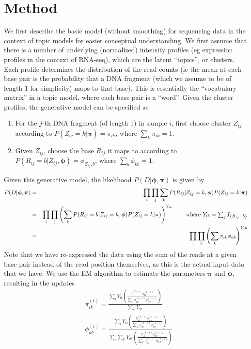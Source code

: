 \documentclass[11pt]{article}
\begin{document}
\section{Method}
We first describe the basic model (without smoothing) for sequencing data in the context of topic models for easier conceptual understanding. We first assume that there is a number of underlying (normalized) intensity profiles (eg expression profiles in the context of RNA-seq), which are the latent ``topics'', or clusters. Each profile determines the distribution of the read counts (ie the mean at each base pair is the probability that a DNA fragment (which we assume to be of length 1 for simplicity) maps to that base). This is essentially the ``vocabulary matrix'' in a topic model, where each base pair is a ``word''. Given the cluster profiles, the generative model can be specified as 
\begin{enumerate}
\item For the $j$-th DNA fragment (of length 1) in sample $i$, first choose cluster $Z_{ij}$ according to $P(Z_{ij}=k|\bm{\pi})=\pi_{ik}$, where $\sum_k\pi_{ik}=1$.
\item Given $Z_{ij}$, choose the base $R_{ij}$ it maps to according to $P(R_{ij}=b|Z_{ij},\bm{\phi})=\phi_{Z_{ij},b}$, where $\sum_b\phi_{kb}=1$.
\end{enumerate}
Given this generative model, the likelihood $P(D|\bm{\phi},\bm{\pi})$ is given by
\begin{eqnarray}
P(D|\bm{\phi},\bm{\pi})&=&\prod_i\prod_j\sum_k P(R_{ij}|Z_{ij}=k,\bm{\phi})P(Z_{ij}=k|\bm{\pi}) \notag\\
&=&\prod_i\prod_b\left(\sum_k P(R_{ij}=b|Z_{ij}=k,\bm{\phi})P(Z_{ij}=k|\bm{\pi})\right)^{Y_{ib}} \hspace{0.3in} \mbox{where $Y_{ib}=\sum_j I_{\{R_{ij}=b\}}$} \notag\\
&=&\prod_i\prod_b\left(\sum_k \pi_{ik}\phi_{kb}\right)^{Y_ib}\\
\end{eqnarray}
Note that we have re-expressed the data using the sum of the reads at a given base pair instead of the read position themselves, as this is the actual input data that we have. We use the EM algorithm to estimate the parameters $\bm{\pi}$ and $\bm{\phi}$, resulting in the updates
\begin{eqnarray}\label{eq:em_update}
&\pi_{ik}^{(t)}=\frac{\sum_b Y_{ib}\left(\frac{\pi_{ik}^{(t-1)}\phi_{kb}^{(t-1)}}{\sum_{k'}\pi_{ik'}^{(t-1)}\phi_{k'b}^{(t-1)}}\right)}{\sum_{b'}Y_{ib'}}\\
&\phi_{kb}^{(t)}=\frac{\sum_i Y_{ib}\left(\frac{\pi_{ik}^{(t-1)}\phi_{kb}^{(t-1)}}{\sum_{k'}\pi_{ik'}^{(t-1)}\phi_{k'b}^{(t-1)}}\right)}{\sum_i\sum_{b'} Y_{ib'}\left(\frac{\pi_{ik}^{(t-1)}\phi_{kb'}^{(t-1)}}{\sum_{k'}\pi_{ik'}^{(t-1)}\phi_{k'b'}^{(t-1)}}\right)}
\end{eqnarray}
\end{document}
